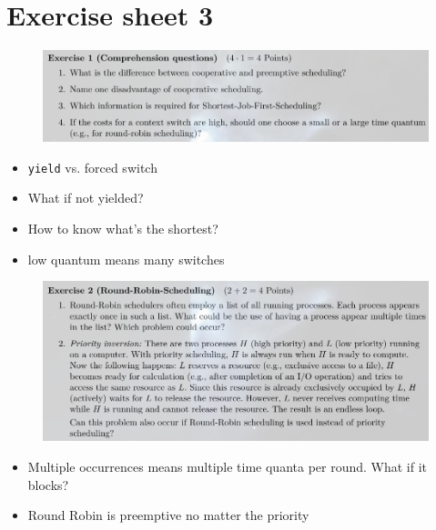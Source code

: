 \documentclass[10pt]{beamer}
\begin{document}
\section{Exercise sheet 3}
\frame{\sectionpage}
\begin{frame}[allowframebreaks]{}
 \begin{figure}
          \includegraphics[keepaspectratio, width=\textwidth, height=\textheight-2\baselineskip-2\baselineskip]{img/100_ex3.png} \\
        \end{figure}
        \begin{itemize}
         \item \texttt{yield} vs. forced switch
         \item What if not yielded?
         \item How to know what's the shortest?
         \item low quantum means many switches
        \end{itemize}
        \framebreak
        
  \begin{figure}
          \includegraphics[keepaspectratio, width=\textwidth, height=\textheight-2\baselineskip-2\baselineskip]{img/101_ex3.png} \\
        \end{figure}
        \begin{itemize}
         \item Multiple occurrences means multiple time quanta per round. What if it blocks?
         \item Round Robin is preemptive no matter the priority
        \end{itemize}
        \framebreak
        

\end{frame}
\end{document}
